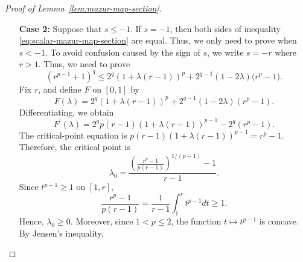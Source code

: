 \documentclass[10pt,a4paper]{amsart}
\begin{document}
\begin{proof}[Proof of Lemma~\ref{lem:mazur-map-section}]
\begin{enumerate}[wide =0pt, labelwidth= 1.1cm]
\[    \]
    Claim that $G' (s) \leq 0$. Equivalently, 
    \[
        2 \left( \frac{(s^p -1)(s^{p-1} -1)}{p(s-1)^2} \right) 
        \leq s^{p-2} (s+1).
    \]
    Using \eqref{eq:Jen-with-s} and the Hermite--Hadamard inequality with the convex function $t \mapsto t^{p-2}$ on $ [1,s]$, we obtain
    \begin{align}
        2 \left( \frac{(s^p -1)(s^{p-1} -1)}{p(s-1)^2} \right) &=2 (p-1)\left( \frac{s^p -1}{p(s-1)} \right) \left( \frac{s^{p-1} -1}{(p-1)(s-1)} \right)
        \\
        &\leq 
        2(p-1) \left(\frac{s+1}{2}\right)^{p-1}\left( \frac{1}{s-1} \int_{1}^s t^{p-2} dt \right)
        \\
        &\leq 
        2(p-1) \left(\frac{s+1}{2}\right)^{p-1} \left( \frac{s^{p-2}+1}{2} \right)
        \\
        &\leq 2^{1-p}s^{p-2}(s+1)^{p-1} (1 + s^{2-p}). \label{eq:final-first-case}
    \end{align}
    Using H\"older's inequality, we obtain
    \[
        1 + s^{2-p} \leq  2^{p-1}(1+s)^{2-p}.
    \]
    Plugging it into \eqref{eq:final-first-case}, we verify that $G'(s) \leq 0$ for $s >1$. Moreover, since $ q \geq 2$ and $p \leq 2$, we get
\[
    \lim_{s\to\infty}G(s)
    =
    \frac{2^{q-1}}{p} \geq 1.
\]
Thus, $G(s)\geq1$ for $s >1$, proving \eqref{eq:to-prove-final-s} and hence
\eqref{eq:scalar-mazur-map-section} in the case $s\geq1$.
\item[\bf Case 2:] Suppose that $s \leq -1$. If $s = -1$, then both sides of inequality \eqref{eq:scalar-mazur-map-section} are equal. Thus, we only need to prove when $s < -1$. To avoid confusion caused by the sign of $s$, we write $s=-r$ where $ r > 1$. Thus, we need to prove
\begin{equation}
\label{eq:scalar-mazur-map-section-2}
    (r^{p-1}+1)^q
    \leq
    2^q(1+ \lambda (r-1))^p
    +
    2^{q-1}(1-2\lambda)
    \bigl(r^p-1\bigr).
\end{equation}
Fix $r$, and define $F$ on $[0,1]$ by
$$
F(\lambda)=2^q(1+\lambda(r-1))^p+2^{q-1}(1-2 \lambda)\left(r^p-1\right) .
$$
Differentiating, we obtain
$$
F^{\prime}(\lambda)=2^q p(r-1)(1+\lambda(r-1))^{p-1}-2^q\left(r^p-1\right) .
$$
The critical-point equation is
$
p(r-1)(1+\lambda(r-1))^{p-1}=r^p-1 .
$
Therefore, the critical point is
$$
\lambda_0=\frac{\left(\frac{r^p-1}{p(r-1)}\right)^{1 /(p-1)}-1}{r-1} .
$$
Since $t^{p-1} \geq 1$ on $[1, r]$,
$$
\frac{r^p-1}{p(r-1)}=\frac{1}{r-1} \int_1^r t^{p-1} d t \geq 1.
$$
Hence,
$
\lambda_0 \geq 0 .
$
Moreover, since $1<p \leq 2$, the function $t \mapsto t^{p-1}$ is concave. By Jensen's inequality,

\end{enumerate}
\end{proof}
\end{document}
